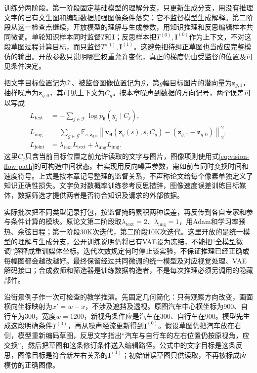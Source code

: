 训练分两阶段。第一阶段固定基础模型的理解分支，只更新生成分支，用没有推理文字的已有文生图和编辑数据加强图像条件落实；它不监督模型生成解释。第二阶段从这一检查点继续，开放模型的理解与生成参数，用知识推理和反思编辑样本共同微调。单轮知识样本同时监督$T$和$\bm I$；反思样本把$T^{(0)},\bm I^{(0)}$作为上下文，不对这段草图过程计算目标，而只监督$T^{(1)},\bm I^{(1)}$。这避免把待纠正草图也当成应完整模仿的输出。开放参数只说明哪些权重允许变化，真正的梯度仍由受监督的位置及可见条件决定。

把文字目标位置记为$\mathcal T$、被监督图像位置记为$\mathcal G$，第$g$幅目标图片的潜向量为$\bm z_{g,1}$，抽样噪声为$\bm z_{g,0}$，其可见上下文为$C_g$。按本章噪声到数据的方向记号，两个误差可以写成
\begin{equation}
  \begin{aligned}
    L_{\mathrm{text}}
      &=-\sum_{j\in\mathcal T}
           \log p_{\bm\theta}(y_j\mid C_j),\\
    L_{\mathrm{img}}
      &=\sum_{g\in\mathcal G}\mathbb E_{s,\bm z_{g,0}}
        \left\lVert
          \bm v_{\bm\theta}(\bm z_g(s),s,C_g)
              -(\bm z_{g,1}-\bm z_{g,0})
        \right\rVert_2^2,\\
    L_{\mathrm{joint}}
      &=\lambda_{\mathrm{text}}L_{\mathrm{text}}
         +\lambda_{\mathrm{img}}L_{\mathrm{img}}.
  \end{aligned}
  \label{eq:vision-unireason-joint-objective}
\end{equation}
这里$C_j$只含当前目标位置之前允许读取的文字与图片，图像项则使用式\eqref{eq:vision-flow-path}的可构造中间状态。若实现用反向噪声参数，需如前节同时变换时间和速度符号。上式是按本章记号整理的监督关系，不声称论文给每个像素单独定义了知识正确性损失。文字负对数概率训练参考反思措辞，图像速度误差训练目标媒体，数据筛选才提供两者是否符合知识及请求的外部依据。

实际批次把不同类型记录打包，按监督掩码累积两种误差，再反传到各自专家和参与条件计算的模块。原论文第二阶段取$\lambda_{\mathrm{text}}=2$、$\lambda_{\mathrm{img}}=1$，用Adam和学习率预热、余弦日程；第一阶段30K次迭代，第二阶段10K次迭代。这里开放的是统一模型的理解与生成分支，公开训练说明仍将已有VAE设为冻结，不能把“全模型微调”解释成重训媒体坐标。迭代次数规定何时停止该实验，不保证推理已经正确或每幅图都会越改越好。最终保留经过共同微调的统一模型及对应视觉处理、VAE解码接口；合成教师和筛选器是训练数据构造者，不是每次推理必须另调用的隐藏部件。

沿街景例子作一次可检查的教学推演。先固定几何简化：只有观察方向改变，画面横向坐标映射为$x'=w-x$，不涉及遮挡及透视。原图汽车中心横坐标为900、自行车为300，宽度$w=1200$，新视角条件应是汽车在300、自行车在900。模型先生成这段明确条件$T^{(0)}$，再从噪声经流更新得到$\bm I^{(0)}$。假设草图仍把汽车放在右侧，模型重新编码草图，反思文字指出“汽车与自行车的左右位置仍按原视角，应交换”，然后把草图和这条修订条件送入编辑路径。公式中的文字目标是这条反思，图像目标是符合新左右关系的$\bm I^{(1)}$；初始错误草图只供读取，不再被标成应模仿的正确图像。

